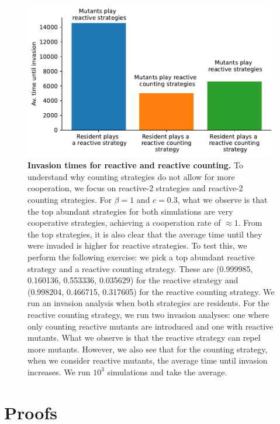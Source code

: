 \documentclass[11pt]{article}
\theoremstyle{plainCl1}
\theoremstyle{plainCl2}
\begin{document}
\begin{figure}[h]
  \centering
  \includegraphics[width=.45\textwidth]{../../figures/siFigCountingReactiveInvasionTime.pdf}
  \caption{{\bf Invasion times for reactive and reactive counting.}
  To understand why counting strategies do not allow for more cooperation, we
  focus on reactive-2 strategies and reactive-2 counting strategies. For
  \(\beta=1\) and \(c=0.3\), what we observe is that the top abundant strategies
  for both simulations are very cooperative strategies, achieving a cooperation
  rate of \(\approx 1\). From the top strategies, it is also clear that the
  average time until they were invaded is higher for reactive strategies. To test
  this, we perform the following exercise: we pick a top abundant reactive
  strategy and a reactive counting strategy. These are (0.999985, 0.160136,
  0.553336, 0.035629) for the reactive strategy and (0.998204, 0.466715, 0.317605)
  for the reactive counting strategy. We run an invasion analysis when both
  strategies are residents. For the reactive counting strategy, we run two
  invasion analyses: one where only counting reactive mutants are introduced and
  one with reactive mutants. What we observe is that the reactive strategy can
  repel more mutants. However, we also see that for the counting strategy, when we
  consider reactive mutants, the average time until invasion increases. We run
  \(10^3\) simulations and take the average.}
\end{figure}



\newpage
\section{Proofs}

\end{document}
